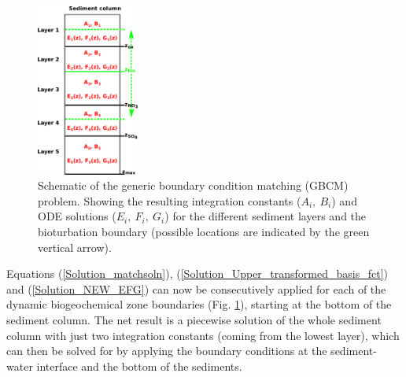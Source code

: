 \documentclass[gmd, manuscript]{copernicus}
\begin{document}
\begin{figure}[htbp]
\begin{center}
	\includegraphics[width=0.3\textwidth]{figures/Boundary_Matching_zbio.pdf}
	\caption{Schematic of the generic boundary condition matching (GBCM) problem. Showing the resulting integration constants ($A_i,\ B_i$) and ODE solutions ($E_i,\ F_i,\ G_i$) for the different sediment layers and the 
	bioturbation boundary (possible locations are indicated by the green vertical arrow).}
	\label{fig:Boundary_matching_algo}
	\end{center}
\end{figure}

Equations (\ref{Solution_matchsoln}), (\ref{Solution_Upper_transformed_basis_fct}) and (\ref{Solution_NEW_EFG}) can now be consecutively applied for each of the dynamic biogeochemical zone boundaries (Fig. \ref{fig:Boundary_matching_algo}), 
starting at the bottom of the sediment column. The net result is a piecewise solution of the whole sediment column with just two integration constants (coming from the lowest layer), which can then be solved for by applying the boundary 
conditions at the sediment-water interface and the bottom of the sediments. 
\end{document}
